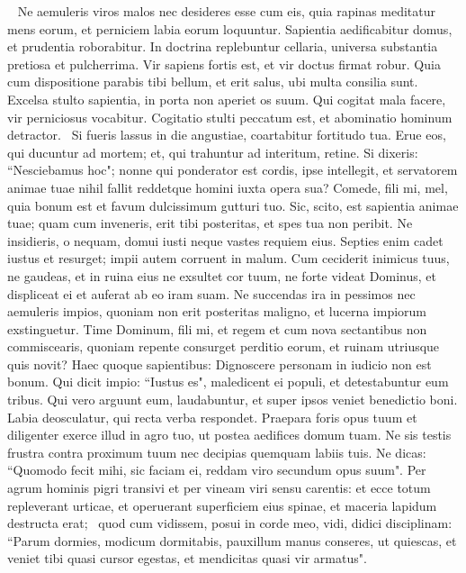 \begin{biblechapter}   
\verse Ne aemuleris viros malos nec desideres esse cum eis, 
\verse quia rapinas meditatur mens eorum, et perniciem labia eorum loquuntur. 
\verse Sapientia aedificabitur domus, et prudentia roborabitur. 
\verse In doctrina replebuntur cellaria, universa substantia pretiosa et pulcherrima. 
\verse Vir sapiens fortis est, et vir doctus firmat robur. 
\verse Quia cum dispositione parabis tibi bellum, et erit salus, ubi multa consilia sunt. 
\verse Excelsa stulto sapientia, in porta non aperiet os suum. 
\verse Qui cogitat mala facere, vir perniciosus vocabitur. 
\verse Cogitatio stulti peccatum est, et abominatio hominum detractor.  
\verse Si fueris lassus in die angustiae, coartabitur fortitudo tua. 
\verse Erue eos, qui ducuntur ad mortem; et, qui trahuntur ad interitum, retine. 
\verse Si dixeris: “Nesciebamus hoc"; nonne qui ponderator est cordis, ipse intellegit, et servatorem animae tuae nihil fallit reddetque homini iuxta opera sua? 
\verse Comede, fili mi, mel, quia bonum est et favum dulcissimum gutturi tuo. 
\verse Sic, scito, est sapientia animae tuae; quam cum inveneris, erit tibi posteritas, et spes tua non peribit. 
\verse Ne insidieris, o nequam, domui iusti neque vastes requiem eius. 
\verse Septies enim cadet iustus et resurget; impii autem corruent in malum. 
\verse Cum ceciderit inimicus tuus, ne gaudeas, et in ruina eius ne exsultet cor tuum, 
\verse ne forte videat Dominus, et displiceat ei et auferat ab eo iram suam. 
\verse Ne succendas ira in pessimos nec aemuleris impios, 
\verse quoniam non erit posteritas maligno, et lucerna impiorum exstinguetur. 
\verse Time Dominum, fili mi, et regem et cum nova sectantibus non commiscearis, 
\verse quoniam repente consurget perditio eorum, et ruinam utriusque quis novit? 
\verse Haec quoque sapientibus: Dignoscere personam in iudicio non est bonum. 
\verse Qui dicit impio: “Iustus es", maledicent ei populi, et detestabuntur eum tribus. 
\verse Qui vero arguunt eum, laudabuntur, et super ipsos veniet benedictio boni. 
\verse Labia deosculatur, qui recta verba respondet. 
\verse Praepara foris opus tuum et diligenter exerce illud in agro tuo, ut postea aedifices domum tuam. 
\verse Ne sis testis frustra contra proximum tuum nec decipias quemquam labiis tuis. 
\verse Ne dicas: “Quomodo fecit mihi, sic faciam ei, reddam viro secundum opus suum". 
\verse Per agrum hominis pigri transivi et per vineam viri sensu carentis: 
\verse et ecce totum repleverant urticae, et operuerant superficiem eius spinae, et maceria lapidum destructa erat;  
\verse quod cum vidissem, posui in corde meo, vidi, didici disciplinam: 
\verse “Parum dormies, modicum dormitabis, pauxillum manus conseres, ut quiescas, 
\verse et veniet tibi quasi cursor egestas, et mendicitas quasi vir armatus". 
\end{biblechapter}

